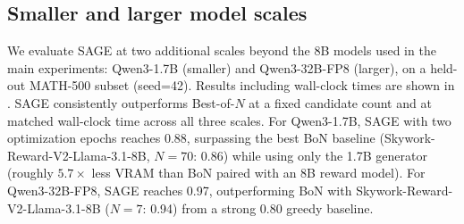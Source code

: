 \documentclass[11pt]{article}
\theoremstyle{plain}
\theoremstyle{definition}
\theoremstyle{remark}
\newcommand{\method}{SAGE}
\begin{document}
\subsection{Smaller and larger model scales}

We evaluate \method{} at two additional scales beyond the 8B models used in the main experiments: Qwen3-1.7B (smaller) and Qwen3-32B-FP8 (larger), on a held-out MATH-500 subset (seed=42). Results including wall-clock times are shown in . \method{} consistently outperforms Best-of-\(N\) at a fixed candidate count and at matched wall-clock time across all three scales. For Qwen3-1.7B, \method{} with two optimization epochs reaches 0.88, surpassing the best BoN baseline (Skywork-Reward-V2-Llama-3.1-8B, $N=70$: 0.86) while using only the 1.7B generator (roughly $5.7\times$ less VRAM than BoN paired with an 8B reward model). For Qwen3-32B-FP8, \method{} reaches 0.97, outperforming BoN with Skywork-Reward-V2-Llama-3.1-8B ($N=7$: 0.94) from a strong 0.80 greedy baseline.
\end{document}
